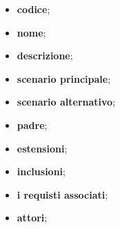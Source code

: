 \begin{itemize}
	\item \textbf{codice};
	\item \textbf{nome};
	\item \textbf{descrizione};
	\item \textbf{scenario principale};
	\item \textbf{scenario alternativo};
	\item \textbf{padre};
	\item \textbf{estensioni};
	\item \textbf{inclusioni};
	\item \textbf{i requisti associati};
	\item \textbf{attori};
\end{itemize}

